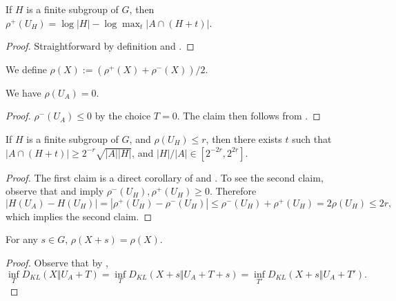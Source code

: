 \begin{corollary}\label{rhoplus-subgroup} If $H$ is a finite subgroup of $G$, then $\rho^+(U_H) = \log |H| - \log \max_t |A \cap (H+t)|$.
\end{corollary}

\begin{proof} Straightforward by definition and .
\end{proof}

\begin{definition}\label{rho-def}\leanok  We define $\rho(X) := (\rho^+(X) + \rho^-(X))/2$.
\end{definition}

\begin{lemma}\label{rho-init}\label{rho_of_uniform}\leanok  We have $\rho(U_A) = 0$.
\end{lemma}

\begin{proof} $\rho^-(U_A)\le 0$ by the choice $T=0$. The claim then follows from .
\end{proof}

\begin{lemma}\label{rho-subgroup}\leanok  If $H$ is a finite subgroup of $G$, and $\rho(U_H) \leq r$, then there exists $t$ such that $|A \cap (H+t)| \geq 2^{-r} \sqrt{|A||H|}$, and $|H|/|A|\in[2^{-2r},2^{2r}]$.
\end{lemma}

\begin{proof} The first claim is a direct corollary of  and . To see the second claim, observe that  and  imply $\rho^-(U_H),\rho^+(U_H)\ge 0$. Therefore $$|H(U_A)-H(U_H)|=|\rho^+(U_H)-\rho^-(U_H)|\le \rho^-(U_H)+\rho^+(U_H)= 2\rho(U_H)\le 2r,$$
  which implies the second claim.
\end{proof}

\begin{lemma}\label{rho-invariant}\leanok{}  For any $s \in G$, $\rho(X+s) = \rho(X)$.
\end{lemma}

\begin{proof} Observe that by , $$\inf_T D_{KL}(X\Vert U_A+T)=\inf_T D_{KL}(X+s\Vert U_A+T+s)=\inf_{T'} D_{KL}(X+s\Vert U_A+T').$$
\end{proof}

